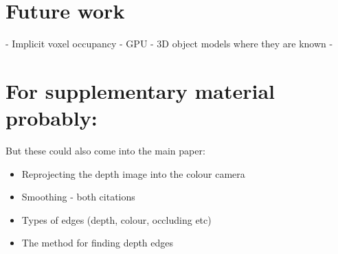 \documentclass[10pt,twocolumn,letterpaper]{article}
\begin{document}
\section{Future work}

- Implicit voxel occupancy
- GPU
- 3D object models where they are known
- 

\section{For supplementary material probably:}
But these could also come into the main paper:
\begin{itemize}
\item Reprojecting the depth image into the colour camera
\item Smoothing - both citations
\item Types of edges (depth, colour, occluding etc)
\item The method for finding depth edges
\end{itemize}



{\small


}

\end{document}
